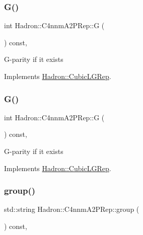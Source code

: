 \subsubsection{\texorpdfstring{G()}{G()}\hspace{0.1cm}{\footnotesize\ttfamily [2/3]}}
{\footnotesize\ttfamily int Hadron\+::\+C4nnm\+A2\+P\+Rep\+::G (\begin{DoxyParamCaption}{ }\end{DoxyParamCaption}) const\hspace{0.3cm}{\ttfamily [inline]}, {\ttfamily [virtual]}}

G-\/parity if it exists 

Implements \mbox{\hyperlink{structHadron_1_1CubicLGRep_ace26f7b2d55e3a668a14cb9026da5231}{Hadron\+::\+Cubic\+L\+G\+Rep}}.

\mbox{\label{structHadron_1_1C4nnmA2PRep_a5a93c463248b9a612bfce17349d772eb}} 
\subsubsection{\texorpdfstring{G()}{G()}\hspace{0.1cm}{\footnotesize\ttfamily [3/3]}}
{\footnotesize\ttfamily int Hadron\+::\+C4nnm\+A2\+P\+Rep\+::G (\begin{DoxyParamCaption}{ }\end{DoxyParamCaption}) const\hspace{0.3cm}{\ttfamily [inline]}, {\ttfamily [virtual]}}

G-\/parity if it exists 

Implements \mbox{\hyperlink{structHadron_1_1CubicLGRep_ace26f7b2d55e3a668a14cb9026da5231}{Hadron\+::\+Cubic\+L\+G\+Rep}}.

\mbox{\label{structHadron_1_1C4nnmA2PRep_abf4767f07f1caa4e9cb8c3ab9629a640}} 
\subsubsection{\texorpdfstring{group()}{group()}\hspace{0.1cm}{\footnotesize\ttfamily [1/3]}}
{\footnotesize\ttfamily std\+::string Hadron\+::\+C4nnm\+A2\+P\+Rep\+::group (\begin{DoxyParamCaption}{ }\end{DoxyParamCaption}) const\hspace{0.3cm}{\ttfamily [inline]}, {\ttfamily [virtual]}}

